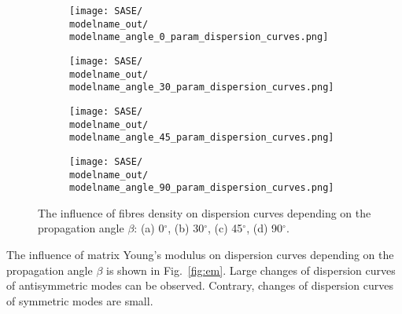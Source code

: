 \documentclass[preprint,12pt]{elsarticle}
\begin{document}
\begin{figure} [h!]
	\centering
	\newcommand{\modelname}{SASE3}
	\begin{subfigure}[b]{0.49\textwidth}
		\centering
		\texttt{[image: SASE/\\modelname\_out/\\modelname\_angle\_0\_param\_dispersion\_curves.png]}
		\caption{}
		\label{fig:rhof0}
	\end{subfigure}
	\hfill
	\begin{subfigure}[b]{0.49\textwidth}
		\centering
		\texttt{[image: SASE/\\modelname\_out/\\modelname\_angle\_30\_param\_dispersion\_curves.png]}
		\caption{}
		\label{fig:rhof30}
	\end{subfigure}
	\begin{subfigure}[b]{0.49\textwidth}
		\centering
		\texttt{[image: SASE/\\modelname\_out/\\modelname\_angle\_45\_param\_dispersion\_curves.png]}
		\caption{}
		\label{fig:rhof45}
	\end{subfigure}
	\hfill
	\begin{subfigure}[b]{0.49\textwidth}
		\centering
		\texttt{[image: SASE/\\modelname\_out/\\modelname\_angle\_90\_param\_dispersion\_curves.png]}
		\caption{}
		\label{fig:rhof90}
	\end{subfigure}
	\caption{The influence of fibres density on dispersion curves depending on the propagation angle $\beta$: (a) 0$^{\circ}$, (b) 30$^{\circ}$, (c) 45$^{\circ}$, (d) 90$^{\circ}$.} 
	\label{fig:rhof}
\end{figure}
\clearpage

The influence of matrix Young's modulus on dispersion curves depending on the propagation angle $\beta$ is shown in Fig.~\ref{fig:em}. Large changes of dispersion curves of antisymmetric modes can be observed. Contrary, changes of dispersion curves of symmetric modes are small.
\end{document}
